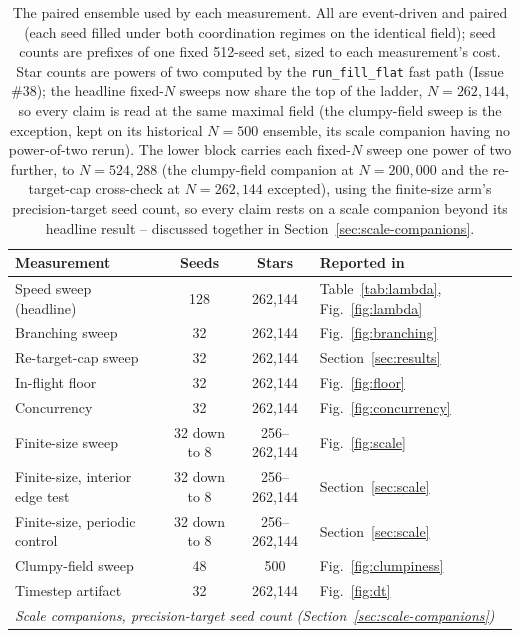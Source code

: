 \begin{table}[!t]
  \centering
  \caption{The paired ensemble used by each measurement. All are event-driven and paired (each seed
    filled under both coordination regimes on the identical field); seed counts are prefixes of one
    fixed 512-seed set, sized to each measurement's cost. Star counts are powers of two computed by
    the \texttt{run\_fill\_flat} fast path (Issue \#38); the headline fixed-$N$ sweeps now share the
    top of the ladder, $N = 262{,}144$, so every claim is read at the same maximal field (the
    clumpy-field sweep is the exception, kept on its historical $N = 500$ ensemble, its scale
    companion having no power-of-two rerun). The lower block carries each fixed-$N$ sweep one power of
    two further, to $N = 524{,}288$ (the clumpy-field companion at $N = 200{,}000$ and the
    re-target-cap cross-check at $N = 262{,}144$ excepted), using the finite-size arm's
    precision-target seed count, so every claim rests on a scale companion beyond its headline result
    -- discussed together in Section~\ref{sec:scale-companions}.}
  \label{tab:ensembles}
  \begin{tabular}{lccl}
    \toprule
    Measurement & Seeds & Stars & Reported in \\
    \midrule
    Speed sweep (headline)  & 128 & 262{,}144 & Table~\ref{tab:lambda}, Fig.~\ref{fig:lambda} \\
    Branching sweep         & 32 & 262{,}144 & Fig.~\ref{fig:branching} \\
    Re-target-cap sweep     & 32 & 262{,}144 & Section~\ref{sec:results} \\
    In-flight floor         & 32 & 262{,}144 & Fig.~\ref{fig:floor} \\
    Concurrency             & 32 & 262{,}144 & Fig.~\ref{fig:concurrency} \\
    Finite-size sweep       & 32 down to 8 & 256--262{,}144 & Fig.~\ref{fig:scale} \\
    Finite-size, interior edge test & 32 down to 8 & 256--262{,}144 & Section~\ref{sec:scale} \\
    Finite-size, periodic control   & 32 down to 8 & 256--262{,}144 & Section~\ref{sec:scale} \\
    Clumpy-field sweep      & 48 & 500 & Fig.~\ref{fig:clumpiness} \\
    Timestep artifact       & 32 & 262{,}144 & Fig.~\ref{fig:dt} \\
    \midrule
    \multicolumn{4}{l}{\emph{Scale companions, precision-target seed count (Section~\ref{sec:scale-companions})}} \\

\end{tabular}
\end{table}

